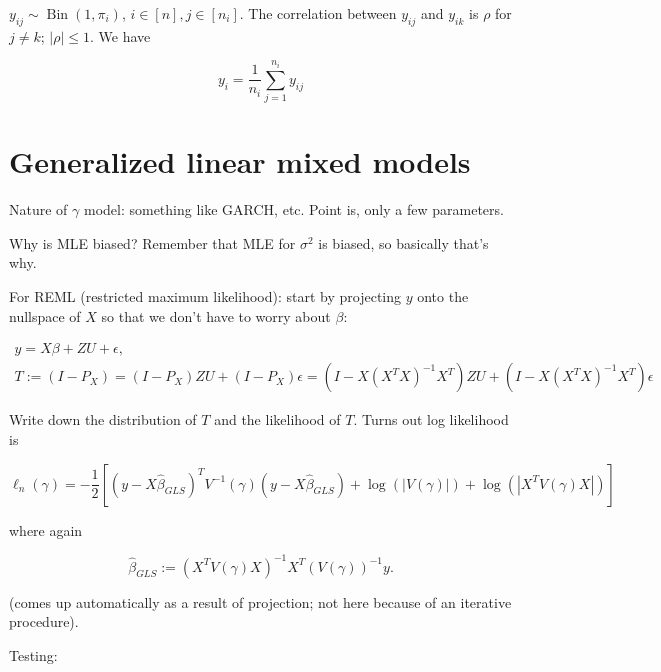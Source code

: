 \begin{example}

\(y_{ij} \sim \operatorname{Bin}(1, \pi_i)\), \(i \in [n], j \in [n_i]\). The correlation between \(y_{ij}\) and \(y_{ik}\) is \(\rho\) for \(j \neq k\); \(|\rho| \leq 1\). We have

\[
y_i = \frac{1}{n_i} \sum_{j=1}^{n_i} y_{ij}
\]

\end{example}

\section{Generalized linear mixed models}

Nature of \(\gamma\) model: something like GARCH, etc. Point is, only a few parameters.

Why is MLE biased? Remember that MLE for \(\sigma^2\) is biased, so basically that's why.

For REML (restricted maximum likelihood): start by projecting \(y\) onto the nullspace of \(X\) so that we don't have to worry about \(\beta\):

\begin{multline*}
y = X \beta+ ZU + \epsilon ,
\\ T := (I - P_X)  = (I - P_X)ZU + (I - P_X) \epsilon = (I - X(X^TX)^{-1}X^T) ZU + (I - X(X^TX)^{-1}X^T)  \epsilon
\end{multline*}

Write down the distribution of \(T\) and the likelihood of \(T\). Turns out log likelihood is

\[
\ell_n( \gamma) = -\frac{1}{2} \left[ (y - X \hat{\beta}_{GLS})^T V^{-1}(\gamma) (y - X \hat{\beta}_{GLS}) + \log \left( |V(\gamma)| \right)   + \log \left( |X^T V(\gamma)X| \right)\right]
\]

where again

\[
\hat{\beta}_{GLS} := (X^T V(\gamma)X)^{-1} X^T (V(\gamma))^{-1} y.
\]

(comes up automatically as a result of projection; not here because of an iterative procedure).

Testing:

